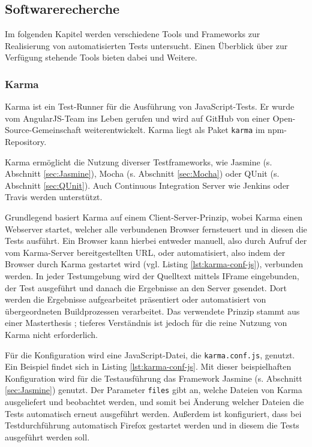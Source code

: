 \subsection{Softwarerecherche}
Im folgenden Kapitel werden verschiedene Tools und Frameworks zur Realisierung von automatisierten Tests untersucht. Einen Überblick über zur Verfügung stehende Tools bieten dabei \textcite{unittest-overview} und Weitere.

\subsubsection{Karma}
\label{sec:Karma}
Karma ist ein Test-Runner für die Ausführung von JavaScript-Tests. Er wurde vom AngularJS-Team ins Leben gerufen und wird auf GitHub von einer Open-Source-Gemeinschaft weiterentwickelt.\cite{karma-index} Karma liegt als Paket \texttt{karma} im npm-Repository\cite{karma-faq}.

Karma ermöglicht die Nutzung diverser Testframeworks, wie Jasmine (s. Abschnitt \ref{sec:Jasmine}), Mocha (s. Abschnitt \ref{sec:Mocha}) oder QUnit (s. Abschnitt \ref{sec:QUnit}). Auch Continuous Integration Server wie Jenkins oder Travis werden unterstützt.\cite{karma-faq}

Grundlegend basiert Karma auf einem Client-Server-Prinzip, wobei Karma einen Webserver startet, welcher alle verbundenen Browser fernsteuert und in diesen die Tests ausführt. Ein Browser kann hierbei entweder manuell, also durch Aufruf der vom Karma-Server bereitgestellten URL, oder automatisiert, also indem der Browser durch Karma gestartet wird (vgl. Listing \ref{lst:karma-conf-js}), verbunden werden. In jeder Testumgebung wird der Quelltext mittels IFrame eingebunden, der Test ausgeführt und danach die Ergebnisse an den Server gesendet. Dort werden die Ergebnisse aufgearbeitet präsentiert oder automatisiert von übergeordneten Buildprozessen verarbeitet. Das verwendete Prinzip stammt aus einer Masterthesis \cite{karma-masterThesis}; tieferes Verständnis ist jedoch für die reine Nutzung von Karma nicht erforderlich.\cite{karma-howItWorks}

Für die Konfiguration wird eine JavaScript-Datei, die \texttt{karma.conf.js}, genutzt. Ein Beispiel findet sich in Listing \ref{lst:karma-conf-js}. Mit dieser beispielhaften Konfiguration wird für die Testausführung das Framework Jasmine (s. Abschnitt \ref{sec:Jasmine}) genutzt. Der Parameter \texttt{files} gibt an, welche Dateien von Karma ausgeliefert und beobachtet werden, und somit bei Änderung welcher Dateien die Tests automatisch erneut ausgeführt werden. Außerdem ist konfiguriert, dass bei Testdurchführung automatisch Firefox gestartet werden und in diesem die Tests ausgeführt werden soll.\cite{karma-configurationFile, karma-files}

